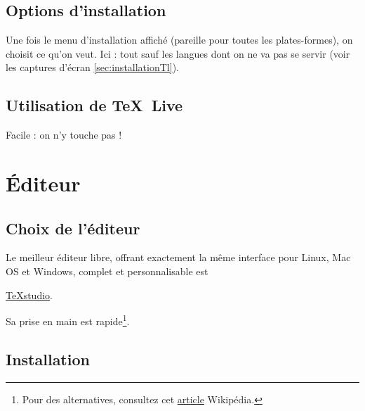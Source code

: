 \subsection{Options d'installation}

Une fois le menu d'installation affiché (pareille pour toutes les plates-formes), on choisit ce qu'on veut. Ici : tout sauf les langues dont on ne va pas se servir (voir les captures d'écran \ref{sec:installationTl}).



\subsection{Utilisation de \TeX \ Live}

Facile : on n'y touche pas !






\section{Éditeur}
\label{sec:Editeur}



\subsection{Choix de l'éditeur}

Le meilleur éditeur libre, offrant exactement la même interface pour Linux, Mac OS et Windows, complet et personnalisable est 
\begin{center}
	\href{http://www.texstudio.org/}{TeXstudio}.
\end{center}

Sa prise en main est rapide\footnote{Pour des alternatives, consultez cet \href{https://en.wikipedia.org/wiki/Comparison_of_TeX_editors}{article} Wikipédia.}.



\subsection{Installation}

